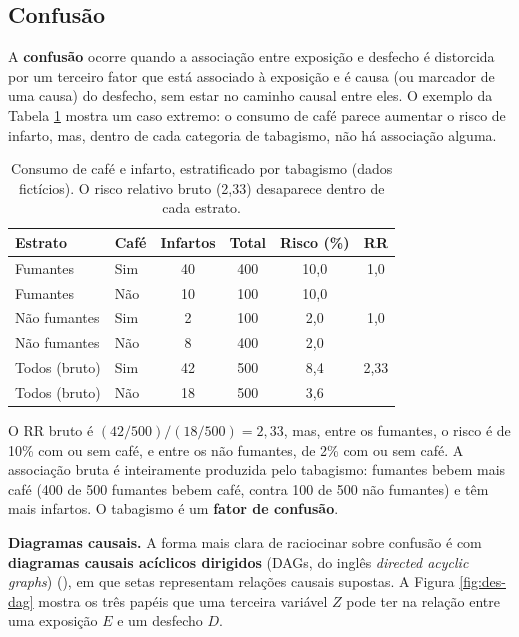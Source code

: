 \documentclass[
]{book}
\begin{document}
\subsection{Confusão}\label{confusuxe3o}

A \textbf{confusão} ocorre quando a associação entre exposição e desfecho é distorcida por um terceiro fator que está associado à exposição e é causa (ou marcador de uma causa) do desfecho, sem estar no caminho causal entre eles. O exemplo da Tabela \ref{tab:des-confusao} mostra um caso extremo: o consumo de café parece aumentar o risco de infarto, mas, dentro de cada categoria de tabagismo, não há associação alguma.

\begin{table}

\caption{\label{tab:des-confusao}Consumo de café e infarto, estratificado por tabagismo (dados fictícios). O risco relativo bruto (2,33) desaparece dentro de cada estrato.}
\centering
\begin{tabular}[t]{l|l|c|c|c|c}
\hline
Estrato & Café & Infartos & Total & Risco (\%) & RR\\
\hline
Fumantes & Sim & 40 & 400 & 10,0 & 1,0\\
\hline
Fumantes & Não & 10 & 100 & 10,0 & \\
\hline
Não fumantes & Sim & 2 & 100 & 2,0 & 1,0\\
\hline
Não fumantes & Não & 8 & 400 & 2,0 & \\
\hline
Todos (bruto) & Sim & 42 & 500 & 8,4 & 2,33\\
\hline
Todos (bruto) & Não & 18 & 500 & 3,6 & \\
\hline
\end{tabular}
\end{table}

O RR bruto é \((42/500)/(18/500) = 2{,}33\), mas, entre os fumantes, o risco é de 10\% com ou sem café, e entre os não fumantes, de 2\% com ou sem café. A associação bruta é inteiramente produzida pelo tabagismo: fumantes bebem mais café (400 de 500 fumantes bebem café, contra 100 de 500 não fumantes) e têm mais infartos. O tabagismo é um \textbf{fator de confusão}.

\textbf{Diagramas causais.} A forma mais clara de raciocinar sobre confusão é com \textbf{diagramas causais acíclicos dirigidos} (DAGs, do inglês \emph{directed acyclic graphs}) (), em que setas representam relações causais supostas. A Figura \ref{fig:des-dag} mostra os três papéis que uma terceira variável \(Z\) pode ter na relação entre uma exposição \(E\) e um desfecho \(D\).
\end{document}
